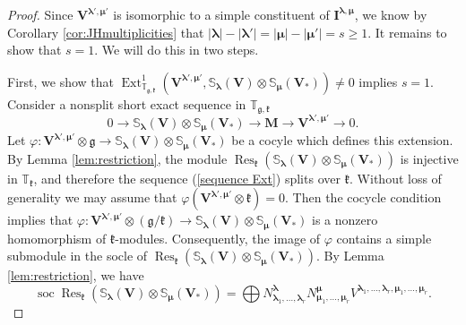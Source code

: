 \documentclass[12pt,oneside,english]{amsart}
\numberwithin{equation}{section}
\numberwithin{figure}{section}
\theoremstyle{plain}
\theoremstyle{plain}
\theoremstyle{remark}
\theoremstyle{definition}
\theoremstyle{plain}
\theoremstyle{remark}
\theoremstyle{definition}
\theoremstyle{plain}
\theoremstyle{plain}
\theoremstyle{definition}
\newcommand{\bV}{\mathbf{V}}
\newcommand{\bI}{\mathbf{I}}
\newcommand{\bM}{\mathbf{M}}
\newcommand{\soc}{\operatorname{soc}}
\newcommand{\fg}{\mathfrak{g}}
\newcommand{\fk}{\mathfrak{k}}
\newcommand{\Res}{\operatorname{Res}}
\begin{document}
    \begin{proof}  Since $\bV^{\boldsymbol{\lambda}',{\boldsymbol{\mu}}'}$ is isomorphic to a simple constituent of $\bI^{\boldsymbol{\lambda},{\boldsymbol{\mu}}}$, we know by Corollary \ref{cor:JHmultiplicities} that
      $|\boldsymbol{\lambda}|-|\boldsymbol{\lambda}'|=|{\boldsymbol{\mu}}|-|{\boldsymbol{\mu}}'|=s\geq 1$. It remains to show that $s=1$. We will do this in two steps.

      First, we show that
      $\operatorname{Ext}^1_{\mathbb T_{\fg,\fk}}(\bV^{\boldsymbol{\lambda}',{\boldsymbol{\mu}}'},\mathbb{S}_{\boldsymbol{\lambda}}(\bV)\otimes \mathbb{S}_{{\boldsymbol{\mu}}}(\bV_*))\neq 0$ implies $s=1$. Consider
      a nonsplit short exact sequence in $\mathbb T_{\fg,\fk}$
      \begin{equation}\label{sequence Ext} 0\to \mathbb{S}_{\boldsymbol{\lambda}}(\bV)\otimes \mathbb{S}_{{\boldsymbol{\mu}}}(\bV_*)\to \bM\to \bV^{\boldsymbol{\lambda}',{\boldsymbol{\mu}}'}\to 0.\end{equation}
Let $\varphi:\bV^{\boldsymbol{\lambda}',{\boldsymbol{\mu}}'}\otimes\fg\to \mathbb{S}_{\boldsymbol{\lambda}}(\bV)\otimes \mathbb{S}_{{\boldsymbol{\mu}}}(\bV_*)$ be a cocyle which defines this extension.   By Lemma \ref{lem:restriction}, the module $\Res_{\fk}( \mathbb{S}_{\boldsymbol{\lambda}}(\bV)\otimes \mathbb{S}_{{\boldsymbol{\mu}}}(\bV_*))$ is injective in $\mathbb T_{\fk}$, and therefore the sequence (\ref{sequence Ext}) splits over $\fk$. Without loss of generality we may assume that $\varphi(\bV^{\boldsymbol{\lambda}',{\boldsymbol{\mu}}'}\otimes\fk)=0$. Then the cocycle condition implies that
      $\varphi:\bV^{\boldsymbol{\lambda}',{\boldsymbol{\mu}}'}\otimes(\fg/\fk)\to \mathbb{S}_{\boldsymbol{\lambda}}(\bV)\otimes \mathbb{S}_{{\boldsymbol{\mu}}}(\bV_*)$ is a nonzero homomorphism of $\fk$-modules.  Consequently, the image of $\varphi$
      contains a simple submodule in the socle of $\Res_{\fk}( \mathbb{S}_{\boldsymbol{\lambda}}(\bV)\otimes \mathbb{S}_{{\boldsymbol{\mu}}}(\bV_*))$. By Lemma \ref{lem:restriction}, we have
     $$\soc\Res_{\fk}(\mathbb{S}_{\boldsymbol{\lambda}}(\bV)\otimes \mathbb{S}_{{\boldsymbol{\mu}}}(\bV_*))=\bigoplus N^{\boldsymbol{\lambda}}_{\boldsymbol{\lambda}_1,\dots,\boldsymbol{\lambda}_r}N^{{\boldsymbol{\mu}}}_{{\boldsymbol{\mu}}_1,\dots,{\boldsymbol{\mu}}_r}V^{\boldsymbol{\lambda}_1,\dots,\boldsymbol{\lambda}_r,{\boldsymbol{\mu}}_1,\dots,{\boldsymbol{\mu}}_r}.$$



\end{proof}
\end{document}
